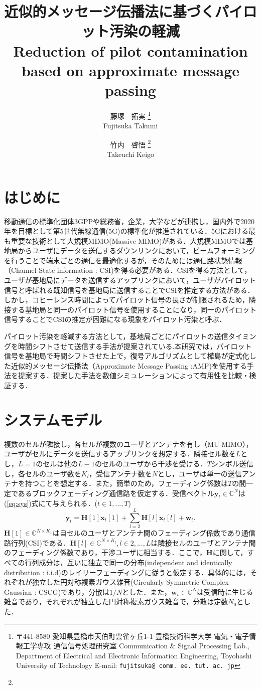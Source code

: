 \documentclass{jarticle}
\title{
  近似的メッセージ伝播法に基づくパイロット汚染の軽減 \\
  Reduction of pilot contamination based on approximate message passing
}
\author{
藤塚　拓実
  \thanks{ 
    〒441-8580 愛知県豊橋市天伯町雲雀ヶ丘1-1 豊橋技術科学大学 電気・電子情報工学専攻 通信信号処理研究室 Communication \& Signal Processing Lab., Department of Electrical and Electronic Information Engineering, Toyohashi University of Technology
    E-mail: {\tt fujitsuka@\allowbreak
    comm.\allowbreak
    ee.\allowbreak
    tut.\allowbreak
    ac.\allowbreak
    jp}
  }\\
  Fujitsuka Takumi
%
  \and
竹内　啓悟
\thanks{
    \samethanks{1} 
  }\\
Takeuchi Keigo
}
\begin{document}
\maketitle

\section{はじめに}
移動通信の標準化団体3GPPや総務省，企業，大学などが連携し，国内外で2020年を目標として第5世代無線通信(5G)の標準化が推進されている\cite{5gmf}．5Gにおける最も重要な技術として大規模MIMO(Massive MIMO)\cite{Marzetta}\cite{Rusek}がある．大規模MIMOでは基地局からユーザにデータを送信するダウンリンクにおいて，ビームフォーミングを行うことで端末ごとの通信を最適化するが，そのためには通信路状態情報（Channel State information : CSI)を得る必要がある．CSIを得る方法として，ユーザが基地局にデータを送信するアップリンクにおいて，ユーザがパイロット信号と呼ばれる既知信号を基地局に送信することでCSIを推定する方法がある．しかし，コヒーレンス時間によってパイロット信号の長さが制限されるため，隣接する基地局と同一のパイロット信号を使用することになり，同一のパイロット信号することでCSIの推定が困難になる現象をパイロット汚染\cite{Marzetta}と呼ぶ．

パイロット汚染を軽減する方法として，基地局ごとにパイロットの送信タイミングを時間シフトさせて送信する手法が提案されている\cite{Appaiah}.本研究では，パイロット信号を基地局で時間シフトさせた上で，復号アルゴリズムとして樺島が定式化した近似的メッセージ伝播法（Approximate Message Passing :AMP)\cite{kabashima}を使用する手法を提案する．提案した手法を数値シミュレーションによって有用性を比較・検証する．

\section{システムモデル}
複数のセルが隣接し，各セルが複数のユーザとアンテナを有し（MU-MIMO），ユーザがセルにデータを送信するアップリンクを想定する．隣接セル数を$L$とし，$L=1$のセルは他の$L-1$のセルのユーザから干渉を受ける．$T$シンボル送信し，各セルのユーザ数を$K_{l}$，受信アンテナ数を$N$とし，ユーザは単一の送信アンテナを持つことを想定する．また，簡単のため，フェーディング係数は$T$の間一定であるブロックフェーディング通信路を仮定する．受信ベクトル$\boldsymbol{y}_t \in \mathbb{C}^{N}$は(\ref{eq:sys})式にて与えられる．($t \in {1,...,T}$)
\begin{equation}
    \label{eq:sys}
    \boldsymbol{y}_t = \boldsymbol{H}[1]\boldsymbol{x}_{t}[1]+\sum^{L}_{l=2}\boldsymbol{H}[l]\boldsymbol{x}_{t}[l]+\boldsymbol{w}_{t}.
\end{equation}
$\boldsymbol{H}[1]\in\mathbb{C}^{N\times K_{1}}$は自セルのユーザとアンテナ間のフェーディング係数であり通信路行列(CSI)である．$\boldsymbol{H}[l]\in\mathbb{C}^{N\times K_{l}} ,l \in {2,...,L}$は隣接セルのユーザとアンテナ間のフェーディング係数であり，干渉ユーザに相当する．ここで，$\boldsymbol{H}$に関して，すべての行列成分は，互いに独立で同一の分布(independent and identically distribution : i.i.d)のレイリーフェーディングに従うと仮定する．具体的には，それぞれが独立した円対称複素ガウス雑音(Circularly Symmetric Complex Gaussian : CSCG)であり，分散は$1/N$とした．また，$\boldsymbol{w}_{t}\in\mathbb{C}^{N}$は受信時に生じる雑音であり，それぞれが独立した円対称複素ガウス雑音で，分散は定数$N_0$とした．
\end{document}
